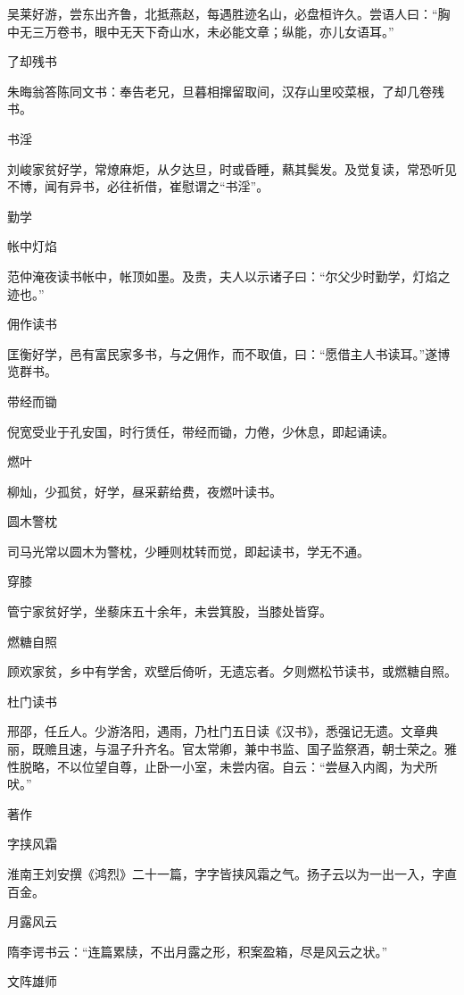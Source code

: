 \documentclass[a4paper,12pt,UTF8,twoside]{ctexbook}
\begin{document}
    吴莱好游，尝东出齐鲁，北抵燕赵，每遇胜迹名山，必盘桓许久。尝语人曰：“胸中无三万卷书，眼中无天下奇山水，未必能文章；纵能，亦儿女语耳。”
    
    了却残书
    
    朱晦翁答陈同文书：奉告老兄，旦暮相撺留取间，汉存山里咬菜根，了却几卷残书。
    
    书淫
    
    刘峻家贫好学，常燎麻炬，从夕达旦，时或昏睡，爇其鬓发。及觉复读，常恐听见不博，闻有异书，必往祈借，崔慰谓之“书淫”。
    
    勤学
    
    帐中灯焰
    
    范仲淹夜读书帐中，帐顶如墨。及贵，夫人以示诸子曰：“尔父少时勤学，灯焰之迹也。”
    
    佣作读书
    
    匡衡好学，邑有富民家多书，与之佣作，而不取值，曰：“愿借主人书读耳。”遂博览群书。
    
    带经而锄
    
    倪宽受业于孔安国，时行赁任，带经而锄，力倦，少休息，即起诵读。
    
    燃叶
    
    柳灿，少孤贫，好学，昼采薪给费，夜燃叶读书。
    
    圆木警枕
    
    司马光常以圆木为警枕，少睡则枕转而觉，即起读书，学无不通。
    
    穿膝
    
    管宁家贫好学，坐藜床五十余年，未尝箕股，当膝处皆穿。
    
    燃糖自照
    
    顾欢家贫，乡中有学舍，欢壁后倚听，无遗忘者。夕则燃松节读书，或燃糖自照。
    
    杜门读书
    
    邢邵，任丘人。少游洛阳，遇雨，乃杜门五日读《汉书》，悉强记无遗。文章典丽，既赡且速，与温子升齐名。官太常卿，兼中书监、国子监祭酒，朝士荣之。雅性脱略，不以位望自尊，止卧一小室，未尝内宿。自云：“尝昼入内阁，为犬所吠。”
    
    著作
    
    字挟风霜
    
    淮南王刘安撰《鸿烈》二十一篇，字字皆挟风霜之气。扬子云以为一出一入，字直百金。
    
    月露风云
    
    隋李谔书云：“连篇累牍，不出月露之形，积案盈箱，尽是风云之状。”
    
    文阵雄师
    
\end{document}
